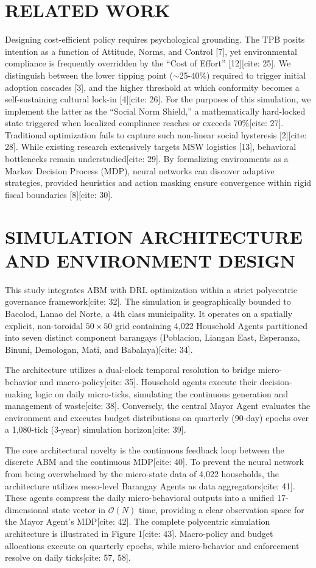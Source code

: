 \documentclass[conference]{IEEEtran}
\begin{document}
\section{RELATED WORK}
Designing cost-efficient policy requires psychological grounding. The TPB posits intention as a function of Attitude, Norms, and Control [7], yet environmental compliance is frequently overridden by the ``Cost of Effort'' [12][cite: 25]. We distinguish between the lower tipping point ($\sim$25-40\%) required to trigger initial adoption cascades [3], and the higher threshold at which conformity becomes a self-sustaining cultural lock-in [4][cite: 26]. For the purposes of this simulation, we implement the latter as the ``Social Norm Shield,'' a mathematically hard-locked state triggered when localized compliance reaches or exceeds 70\%[cite: 27]. Traditional optimization fails to capture such non-linear social hysteresis [2][cite: 28]. While existing research extensively targets MSW logistics [13], behavioral bottlenecks remain understudied[cite: 29]. By formalizing environments as a Markov Decision Process (MDP), neural networks can discover adaptive strategies, provided heuristics and action masking ensure convergence within rigid fiscal boundaries [8][cite: 30].

\section{SIMULATION ARCHITECTURE AND ENVIRONMENT DESIGN}
This study integrates ABM with DRL optimization within a strict polycentric governance framework[cite: 32]. The simulation is geographically bounded to Bacolod, Lanao del Norte, a 4th class municipality. It operates on a spatially explicit, non-toroidal $50\times50$ grid containing 4,022 Household Agents partitioned into seven distinct component barangays (Poblacion, Liangan East, Esperanza, Binuni, Demologan, Mati, and Babalaya)[cite: 34]. 

The architecture utilizes a dual-clock temporal resolution to bridge micro-behavior and macro-policy[cite: 35]. Household agents execute their decision-making logic on daily micro-ticks, simulating the continuous generation and management of waste[cite: 38]. Conversely, the central Mayor Agent evaluates the environment and executes budget distributions on quarterly (90-day) epochs over a 1,080-tick (3-year) simulation horizon[cite: 39]. 

The core architectural novelty is the continuous feedback loop between the discrete ABM and the continuous MDP[cite: 40]. To prevent the neural network from being overwhelmed by the micro-state data of 4,022 households, the architecture utilizes meso-level Barangay Agents as data aggregators[cite: 41]. These agents compress the daily micro-behavioral outputs into a unified 17-dimensional state vector in $\mathcal{O}(N)$ time, providing a clear observation space for the Mayor Agent's MDP[cite: 42]. The complete polycentric simulation architecture is illustrated in Figure 1[cite: 43]. Macro-policy and budget allocations execute on quarterly epochs, while micro-behavior and enforcement resolve on daily ticks[cite: 57, 58].
\end{document}
